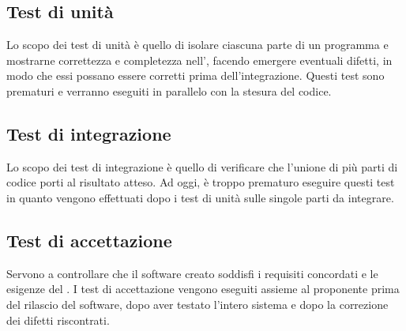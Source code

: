 \subsection{Test di unità}
Lo scopo dei test di unità è quello di isolare ciascuna parte di un programma e mostrarne correttezza e completezza nell’, facendo emergere eventuali difetti, in modo che essi possano essere corretti prima dell’integrazione.
Questi test sono prematuri e verranno eseguiti in parallelo con la stesura del codice.
\subsection{Test di integrazione}
Lo scopo dei test di integrazione è quello di verificare che l'unione di più parti di codice porti al risultato atteso. Ad oggi, è troppo prematuro eseguire questi test in quanto vengono effettuati dopo i test di unità sulle singole parti da integrare.
\subsection{Test di accettazione}
Servono a controllare che il software creato soddisfi i requisiti concordati e le esigenze del . I test di accettazione vengono eseguiti assieme al proponente prima del rilascio del software, dopo aver testato l’intero sistema e dopo la correzione dei difetti riscontrati.
